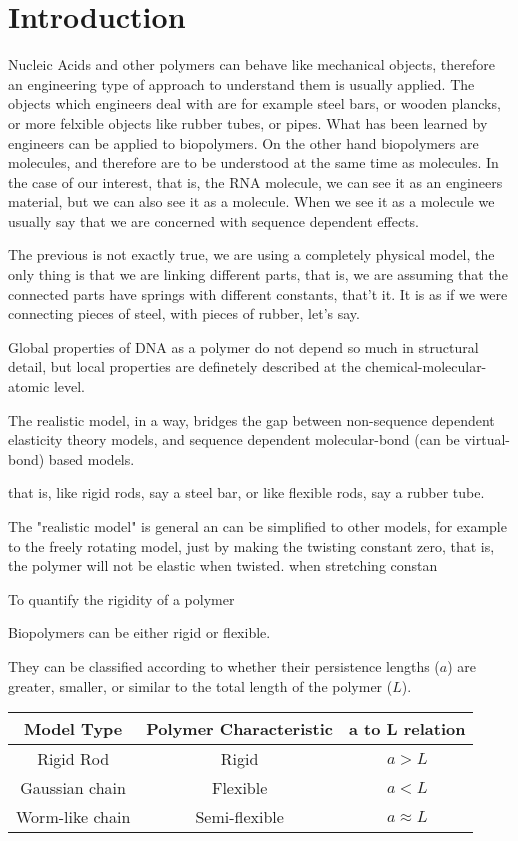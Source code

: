 \part{Introduction}
Nucleic Acids and other polymers can behave like mechanical objects,
therefore an engineering type of approach to understand them is
usually applied. The objects which engineers deal with are for example
steel bars, or wooden plancks, or more felxible objects like rubber
tubes, or pipes. What has been learned by engineers can be applied to
biopolymers. On the other hand biopolymers are molecules, and
therefore are to be understood at the same time as molecules. In the
case of our interest, that is, the RNA molecule, we can see it as an
engineers material, but we can also see it as a molecule. When we see
it as a molecule we usually say that we are concerned with sequence
dependent effects.

The previous is not exactly true, we are using a completely physical
model, the only thing is that we are linking different parts, that is,
we are assuming that the connected parts have springs with different
constants, that't it. It is as if we were connecting pieces of steel,
with pieces of rubber, let's say.


Global properties of DNA as a polymer do not depend so much in
structural detail, but local properties are definetely described at
the chemical-molecular-atomic level.

The realistic model, in a way, bridges the gap between non-sequence
dependent elasticity theory models, and sequence dependent
molecular-bond (can be virtual-bond) based models.


that is, like rigid rods, say a steel bar, or like flexible rods, say
a rubber tube.

The "realistic model" is general an can be simplified to other models,
for example to the freely rotating model, just by making the twisting
constant zero, that is, the polymer will not be elastic when twisted.
when stretching constan 



To quantify the rigidity of a polymer

Biopolymers can be either rigid or flexible. 

They can be classified  according to whether their persistence lengths ($a$)
are greater, smaller, or similar to the total length of the polymer ($L$).

\begin{table}[htbp]
\begin{center}  
\begin{tabular}{c|c|c}
\hline
Model Type      & Polymer Characteristic & a to L relation\\ \hline
Rigid Rod       & Rigid          &        $a > L$   \\
Gaussian chain  & Flexible       &        $a < L$   \\
Worm-like chain & Semi-flexible  &    $a \approx L$ \\
\hline
\end{tabular}
\end{center}
\end{table}

